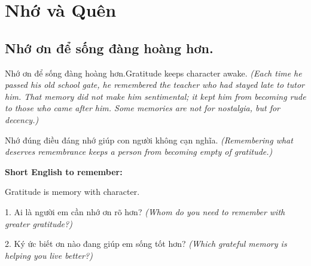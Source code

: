 \chapter{Nhớ và Quên}

\section{Nhớ ơn để sống đàng hoàng hơn.}
\begin{truyen}{Nhớ ơn để sống đàng hoàng hơn.}{Gratitude keeps character awake.}
\textit{(Each time he passed his old school gate, he remembered the teacher who had stayed late to tutor him. That memory did not make him sentimental; it kept him from becoming rude to those who came after him. Some memories are not for nostalgia, but for decency.)}
\end{truyen}
\begin{baihoc}
Nhớ đúng điều đáng nhớ giúp con người không cạn nghĩa.
\textit{(Remembering what deserves remembrance keeps a person from becoming empty of gratitude.)}
\end{baihoc}
\begin{ghinhoanh}
\textbf{Short English to remember:}

Gratitude is memory with character.
\end{ghinhoanh}
\begin{tuhocnhanh}
1. Ai là người em cần nhớ ơn rõ hơn? \textit{(Whom do you need to remember with greater gratitude?)}

2. Ký ức biết ơn nào đang giúp em sống tốt hơn? \textit{(Which grateful memory is helping you live better?)}
\end{tuhocnhanh}
\ngancach

